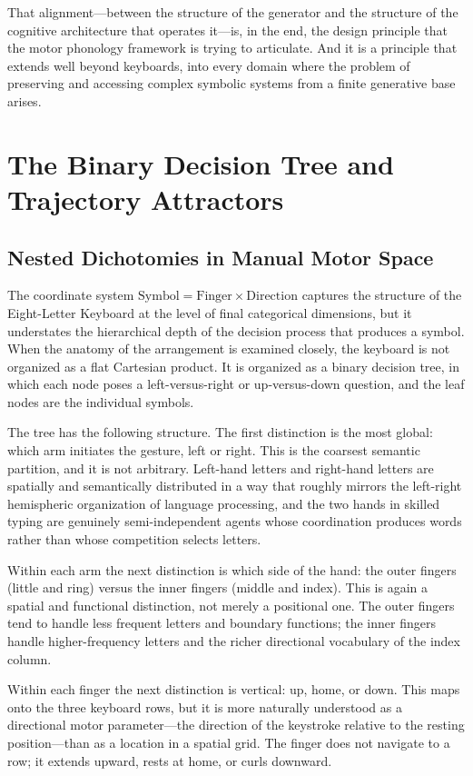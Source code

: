 \documentclass[12pt,a4paper]{article}
\theoremstyle{plain}
\theoremstyle{definition}
\theoremstyle{remark}
\begin{document}
That alignment---between the structure of the generator and the structure of
the cognitive architecture that operates it---is, in the end, the design
principle that the motor phonology framework is trying to articulate. And it
is a principle that extends well beyond keyboards, into every domain where
the problem of preserving and accessing complex symbolic systems from a
finite generative base arises.

\section{The Binary Decision Tree and Trajectory Attractors}

\subsection{Nested Dichotomies in Manual Motor Space}

The coordinate system $\text{Symbol} = \text{Finger} \times \text{Direction}$
captures the structure of the Eight-Letter Keyboard at the level of final
categorical dimensions, but it understates the hierarchical depth of the
decision process that produces a symbol. When the anatomy of the arrangement
is examined closely, the keyboard is not organized as a flat Cartesian product.
It is organized as a binary decision tree, in which each node poses a
left-versus-right or up-versus-down question, and the leaf nodes are the
individual symbols.

The tree has the following structure. The first distinction is the most global:
which arm initiates the gesture, left or right. This is the coarsest semantic
partition, and it is not arbitrary. Left-hand letters and right-hand letters
are spatially and semantically distributed in a way that roughly mirrors the
left-right hemispheric organization of language processing, and the two hands
in skilled typing are genuinely semi-independent agents whose coordination
produces words rather than whose competition selects letters.

Within each arm the next distinction is which side of the hand: the outer
fingers (little and ring) versus the inner fingers (middle and index). This
is again a spatial and functional distinction, not merely a positional one.
The outer fingers tend to handle less frequent letters and boundary functions;
the inner fingers handle higher-frequency letters and the richer directional
vocabulary of the index column.

Within each finger the next distinction is vertical: up, home, or down. This
maps onto the three keyboard rows, but it is more naturally understood as a
directional motor parameter---the direction of the keystroke relative to the
resting position---than as a location in a spatial grid. The finger does not
navigate to a row; it extends upward, rests at home, or curls downward.
\end{document}
